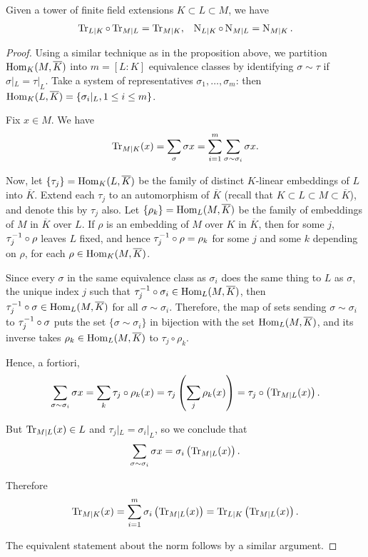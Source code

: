 \begin{cor}
	Given a tower of finite field extensions $K\subset L\subset M$, we have
	\begin{align*}
		\operatorname{Tr}_{L\mid K} \circ \operatorname{Tr}_{M\mid L} = \operatorname{Tr}_{M\mid K}, & & \operatorname{N}_{L\mid K} \circ \operatorname{N}_{M\mid L} = \operatorname{N}_{M\mid K}.
	\end{align*}
\end{cor}
\begin{proof}
	Using a similar technique as in the proposition above, we partition $\text{Hom}_K(M,\overline{K})$ into $m=[L:K]$ equivalence classes by identifying $\sigma\sim\tau$ if $\sigma|_L = \tau|_L$. Take a system of representatives $\sigma_1,\dots,\sigma_m$: then $\text{Hom}_K(L,\overline{K}) = \{\sigma_i|_L , 1\leq i \leq m\}$.

	Fix $x\in M$. We have
	\begin{align*}
		\operatorname{Tr}_{M\mid K}(x) = \sum_\sigma \sigma x = \sum_{i=1}^m \sum_{\sigma\sim\sigma_i} \sigma x.
	\end{align*}

	Now, let $\{\tau_j\} = \text{Hom}_K(L,\overline{K})$ be the family of distinct $K$-linear embeddings of $L$ into $\overline{K}$. Extend each $\tau_j$ to an automorphism of $\overline{K}$ (recall that $K\subset L\subset M \subset \overline{K}$), and denote this by $\tau_j$ also. Let $\{\rho_k\}=\text{Hom}_L(M,\overline{K})$ be the family of embeddings of $M$ in $\overline{K}$ over $L$. If $\rho$ is an embedding of $M$ over $K$ in $\overline{K}$, then for some $j$, $\tau_j^{-1}\circ\rho$ leaves $L$ fixed, and hence $\tau_j^{-1}\circ\rho=\rho_k$ for some $j$ and some $k$ depending on $\rho$, for each $\rho\in\text{Hom}_K(M,\overline{K})$.

	Since every $\sigma$ in the same equivalence class as $\sigma_i$ does the same thing to $L$ as $\sigma$, the unique index $j$ such that $\tau_j^{-1}\circ\sigma_i\in\text{Hom}_L(M,\overline{K})$, then $\tau_j^{-1}\circ\sigma\in\text{Hom}_L(M,\overline{K})$ for all $\sigma\sim\sigma_i$. Therefore, the map of sets sending $\sigma\sim\sigma_i$ to $\tau_j^{-1}\circ\sigma$ puts the set $\{\sigma\sim\sigma_i\}$ in bijection with the set $\text{Hom}_L(M,\overline{K})$, and its inverse takes $\rho_k\in\text{Hom}_L(M,\overline{K})$ to $\tau_j\circ\rho_k$.

	Hence, a fortiori,
	\[
		\sum_{\sigma\sim\sigma_i} \sigma x = \sum_k \tau_j\circ\rho_k(x) = \tau_j\left(\sum_j\rho_k(x)\right) = \tau_j\circ\left(\operatorname{Tr}_{M\mid L}(x)\right).
	\]

	But $\operatorname{Tr}_{M\mid L}(x)\in L$ and $\tau_j|_L=\sigma_i|_L$, so we conclude that
	\[
		\sum_{\sigma\sim\sigma_i} \sigma x = \sigma_i\left(\operatorname{Tr}_{M\mid L}(x)\right).
	\]

	Therefore
	\[
		\operatorname{Tr}_{M\mid K}(x) = \sum_{i=1}^m \sigma_i\left(\operatorname{Tr}_{M\mid L}(x)\right) = \operatorname{Tr}_{L\mid K}\left(\operatorname{Tr}_{M\mid L}(x)\right).
	\]

	The equivalent statement about the norm follows by a similar argument.

\end{proof}


